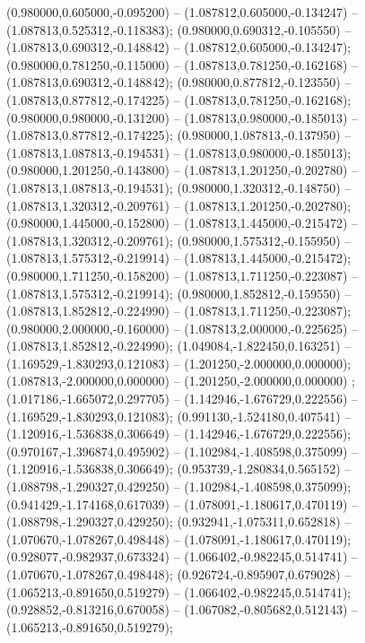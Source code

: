  (0.980000,0.605000,-0.095200) -- (1.087812,0.605000,-0.134247) -- (1.087813,0.525312,-0.118383);
 (0.980000,0.690312,-0.105550) -- (1.087813,0.690312,-0.148842) -- (1.087812,0.605000,-0.134247);
 (0.980000,0.781250,-0.115000) -- (1.087813,0.781250,-0.162168) -- (1.087813,0.690312,-0.148842);
 (0.980000,0.877812,-0.123550) -- (1.087813,0.877812,-0.174225) -- (1.087813,0.781250,-0.162168);
 (0.980000,0.980000,-0.131200) -- (1.087813,0.980000,-0.185013) -- (1.087813,0.877812,-0.174225);
 (0.980000,1.087813,-0.137950) -- (1.087813,1.087813,-0.194531) -- (1.087813,0.980000,-0.185013);
 (0.980000,1.201250,-0.143800) -- (1.087813,1.201250,-0.202780) -- (1.087813,1.087813,-0.194531);
 (0.980000,1.320312,-0.148750) -- (1.087813,1.320312,-0.209761) -- (1.087813,1.201250,-0.202780);
 (0.980000,1.445000,-0.152800) -- (1.087813,1.445000,-0.215472) -- (1.087813,1.320312,-0.209761);
 (0.980000,1.575312,-0.155950) -- (1.087813,1.575312,-0.219914) -- (1.087813,1.445000,-0.215472);
 (0.980000,1.711250,-0.158200) -- (1.087813,1.711250,-0.223087) -- (1.087813,1.575312,-0.219914);
 (0.980000,1.852812,-0.159550) -- (1.087813,1.852812,-0.224990) -- (1.087813,1.711250,-0.223087);
 (0.980000,2.000000,-0.160000) -- (1.087813,2.000000,-0.225625) -- (1.087813,1.852812,-0.224990);
 (1.049084,-1.822450,0.163251) -- (1.169529,-1.830293,0.121083) -- (1.201250,-2.000000,0.000000);
 (1.087813,-2.000000,0.000000) -- (1.201250,-2.000000,0.000000) ;
 (1.017186,-1.665072,0.297705) -- (1.142946,-1.676729,0.222556) -- (1.169529,-1.830293,0.121083);
 (0.991130,-1.524180,0.407541) -- (1.120916,-1.536838,0.306649) -- (1.142946,-1.676729,0.222556);
 (0.970167,-1.396874,0.495902) -- (1.102984,-1.408598,0.375099) -- (1.120916,-1.536838,0.306649);
 (0.953739,-1.280834,0.565152) -- (1.088798,-1.290327,0.429250) -- (1.102984,-1.408598,0.375099);
 (0.941429,-1.174168,0.617039) -- (1.078091,-1.180617,0.470119) -- (1.088798,-1.290327,0.429250);
 (0.932941,-1.075311,0.652818) -- (1.070670,-1.078267,0.498448) -- (1.078091,-1.180617,0.470119);
 (0.928077,-0.982937,0.673324) -- (1.066402,-0.982245,0.514741) -- (1.070670,-1.078267,0.498448);
 (0.926724,-0.895907,0.679028) -- (1.065213,-0.891650,0.519279) -- (1.066402,-0.982245,0.514741);
 (0.928852,-0.813216,0.670058) -- (1.067082,-0.805682,0.512143) -- (1.065213,-0.891650,0.519279);
